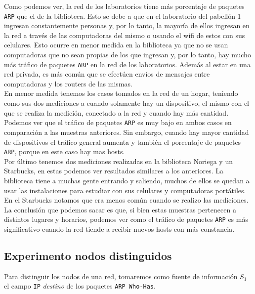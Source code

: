 Como podemos ver, la red de los laboratorios tiene más porcentaje de paquetes \texttt{ARP} que el de la biblioteca. Esto se debe a que en el laboratorio del pabellón 1 ingresan
constantemente personas y, por lo tanto, la mayoría de ellos ingresan en la red a través de las computadoras del mismo o usando el wifi de estos con sus celulares. Esto
ocurre en menor medida en la biblioteca ya que no se usan computadoras que no sean propias de los que ingresan y, por lo tanto, hay mucho más tráfico de paquetes \texttt{ARP} en la red
de los laboratorios. Además al estar en una red privada, es más común que se efectúen envíos de mensajes entre computadoras y los routers de las mismas.\\

En menor medida tenemos los casos tomados en la red de un hogar, teniendo como sus dos mediciones a cuando solamente hay un dispositivo, el mismo con el que se realiza la medición,
conectado a la red y cuando hay más cantidad. Podemos ver que el tráfico de paquetes \texttt{ARP} es muy bajo en ambos casos en comparación a las muestras anteriores. Sin embargo,
cuando hay mayor cantidad de dispositivos el tráfico general aumenta y también el porcentaje de paquetes \texttt{ARP}, porque en este caso hay mas hosts.\\

Por último tenemos dos mediciones realizadas en la biblioteca Noriega y un Starbucks, en estas podemos ver resultados similares a los anteriores. La biblioteca tiene a muchas
gente entrando y saliendo, muchos de ellos se quedan a usar las instalaciones para estudiar con sus celulares y computadoras portátiles. En el Starbucks notamos que era menos
común cuando se realizo las mediciones.\\

La conclusión que podemos sacar es que, si bien estas muestras pertenecen a distintos lugares y horarios, podemos ver como el tráfico de paquetes \texttt{ARP} es más significativo cuando
la red tiende a recibir nuevos hosts con más constancia.



\subsection{Experimento nodos distinguidos}

Para distinguir los nodos de una red, tomaremos como fuente de información $S_1$ el campo
\texttt{IP} \textit{destino} de los paquetes \texttt{ARP Who-Has}.

